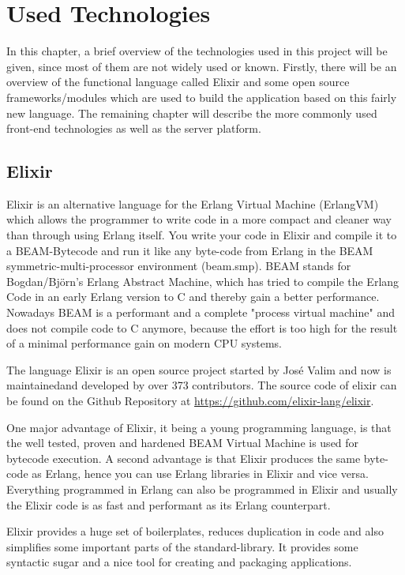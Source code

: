 \chapter{Used Technologies} \label{used_tec}
In this chapter, a brief overview of the technologies used in this project will be given, since most of them are not widely used or known. Firstly, there will be an overview of the functional language called Elixir and some open source frameworks/modules which are used to build the application based on this fairly new language. The remaining chapter will describe the more commonly used front-end technologies as well as the server platform. 

\section{Elixir} \label{elixir_erlangVM}
Elixir is an alternative language for the Erlang Virtual Machine (ErlangVM) which allows the programmer to write code in a more compact and cleaner way than through using Erlang itself. You write your code in Elixir and compile it to a BEAM-Bytecode and run it like any byte-code from Erlang in the BEAM symmetric-multi-processor environment (beam.smp). BEAM stands for Bogdan/Björn's Erlang Abstract Machine, which has tried to compile the Erlang Code in an early Erlang version to C  and thereby gain a better performance. Nowadays BEAM is a performant and a complete "process virtual machine" and does not compile code to C anymore, because the effort is too high for the result of a minimal performance gain on modern CPU systems.

The language Elixir is an open source project started by Jos\'e Valim and now is maintainedand developed by over 373 contributors. The source code of elixir can be found on the Github Repository at \url{https://github.com/elixir-lang/elixir}.

One major advantage of Elixir, it being a young programming language, is that the well tested, proven and hardened BEAM Virtual Machine is used for bytecode execution. A second advantage is that Elixir produces the same byte-code as Erlang, hence you can use Erlang libraries in Elixir and vice versa. Everything programmed in Erlang can also be programmed in Elixir and usually the Elixir code is as fast and performant as its Erlang counterpart.

Elixir provides a huge set of boilerplates, reduces duplication in code and also simplifies some important parts of the standard-library. It provides some syntactic sugar and a nice tool for creating and packaging applications.

